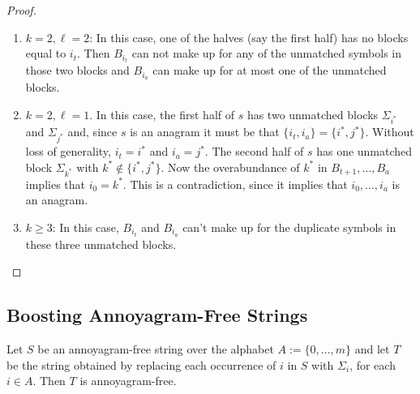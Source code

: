 \documentclass[kpfonts]{patmorin}
\begin{document}
\begin{proof}
\begin{enumerate}
        \item $k=2,\ell=2$: In this case, one of the halves (say the first half) has no blocks equal to $i_t$.  Then $B_{i_t}$ can not make up for any of the unmatched symbols in those two blocks and $B_{i_a}$ can make up for at most one of the unmatched blocks.

        \item $k=2,\ell=1$.  In this case, the first half of $s$ has two unmatched blocks $\Sigma_{i^*}$ and $\Sigma_{j^*}$ and, since $s$ is an anagram it must be that $\{i_t,i_a\}=\{i^*,j^*\}$.  Without loss of generality, $i_t=i^*$ and $i_a=j^*$.  The second half of $s$ has one unmatched block $\Sigma_{k^*}$ with $k^*\not\in\{i^*,j^*\}$.  Now the overabundance of $k^*$ in $B_{t+1},\ldots,B_{a}$ implies that $i_0=k^*$.  This is a contradiction, since it implies that $i_0,\ldots,i_a$ is an anagram.

        \item $k\ge 3$:  In this case, $B_{i_t}$ and $B_{i_a}$ can't make up for the duplicate symbols in these three unmatched blocks.
        \qedhere
    \end{enumerate}
\end{proof}


\subsection{Boosting Annoyagram-Free Strings}

\begin{lem}\label{blow_up_af}
    Let $S$ be an annoyagram-free string over the alphabet $A:=\{0,\ldots,m\}$ and let $T$ be the string obtained by replacing each occurrence of $i$ in $S$ with $\Sigma_i$, for each $i\in A$.  Then $T$ is annoyagram-free.
\end{lem}
\end{document}
